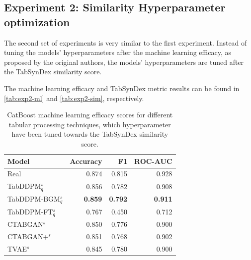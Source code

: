 \subsection{Experiment 2: Similarity Hyperparameter optimization}
\label{ch:Experiment-2}

The second set of experiments is very similar to the first experiment.
Instead of tuning the models' hyperparameters after the machine learning efficacy, as proposed by the original authors,
the models' hyperparameters are tuned after the TabSynDex similarity score.

The machine learning efficacy and TabSynDex metric results can be found in \autoref{tab:exp2-ml} and \autoref{tab:exp2-sim}, respectively.



\begin{table}[h]
	\centering
	\begin{tabular}{lrrr}
		\toprule
		\textbf{Model}        & \textbf{Accuracy} & \textbf{F1}    & \textbf{ROC-AUC} \\
		\midrule
		Real                  & 0.874              & 0.815          & 0.928            \\
		TabDDPM$^{s}_{q}$     & 0.856              & 0.782          & 0.908            \\
		TabDDPM-BGM$^{s}_{q}$ & \textbf{0.859}     & \textbf{0.792} & \textbf{0.911}   \\
		TabDDPM-FT$^{s}_{q}$  & 0.767              & 0.450          & 0.712            \\
		CTABGAN$^{s}$         & 0.850              & 0.776          & 0.900            \\
		CTABGAN+$^{s}$        & 0.851              & 0.768          & 0.902            \\
		TVAE$^{s}$            & 0.845              & 0.780          & 0.900            \\
		\bottomrule
	\end{tabular}
	\caption[Experiment 2 ML-Efficacy]{CatBoost machine learning efficacy scores for different tabular processing techniques, which hyperparameter have been tuned towards the TabSynDex similarity score.}
	\label{tab:exp2-ml}
\end{table}

